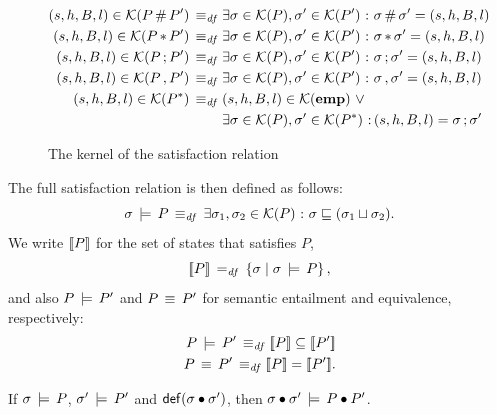 \documentclass[11pt]{article}
\begin{document}
\begin{figure}[ht]
{\begin{minipage}{\columnwidth}
\begin{align*}
		(s,h,B,l) \in \mathcal{K}(P \operatorname{\#} P') \operatorname{\;\equiv_{\mathit{df}}\;} & \exists \sigma \in \mathcal{K}(P), \sigma' \in \mathcal{K}(P') \operatorname{\,:\,} \sigma \operatorname{\#} \sigma' = (s,h,B,l) \\
		(s,h,B,l) \in \mathcal{K}(P \operatorname{\ast} P') \operatorname{\;\equiv_{\mathit{df}}\;} & \exists \sigma \in \mathcal{K}(P), \sigma' \in \mathcal{K}(P') \operatorname{\,:\,} \sigma \operatorname{\ast} \sigma' = (s,h,B,l) \\
		(s,h,B,l) \in \mathcal{K}(P \operatorname{;} P') \operatorname{\;\equiv_{\mathit{df}}\;} & \exists \sigma \in \mathcal{K}(P), \sigma' \in \mathcal{K}(P') \operatorname{\,:\,} \sigma \operatorname{;} \sigma' = (s,h,B,l) \\
		(s,h,B,l) \in \mathcal{K}(P \operatorname{,} P') \operatorname{\;\equiv_{\mathit{df}}\;} & \exists \sigma \in \mathcal{K}(P), \sigma' \in \mathcal{K}(P') \operatorname{\,:\,} \sigma \operatorname{,} \sigma' = (s,h,B,l) \\
		(s,h,B,l) \in \mathcal{K}(P^{\ast}) \operatorname{\;\equiv_{\mathit{df}}\;} & (s,h,B,l) \in \mathcal{K}(\mathbf{emp}) \operatorname{\,\vee\,} \\ &  \exists \sigma \in \mathcal{K}(P),\sigma' \in \mathcal{K}(P^{\ast}) \operatorname{\,:\,} (s,h,B,l) = \sigma \operatorname{;} \sigma'
	\end{align*}
\end{minipage}}
	\caption{\label{fig:presat-relation} The kernel of the satisfaction relation}
\end{figure}

The full satisfaction relation is then defined as follows: \[ \sigma \,\models\, P \operatorname{\;\equiv_{\mathit{df}}\;} \exists \sigma_1,\sigma_2 \in \mathcal{K}(P) \operatorname{\,:\,} \sigma \sqsubseteq (\sigma_1 \sqcup \sigma_2).\] We write $[\![P]\!]$ for the set of states that satisfies $P$,\[ [\![P]\!] \operatorname{\;=_{\mathit{df}}\;} \left\lbrace \sigma \mid \sigma \,\models\, P \right\rbrace,\] and also $P \,\models\, P'$ and $P \,\equiv\, P'$ for semantic entailment and equivalence, respectively: \begin{align*}
	P \sentails P' \iffdef \pred{P} \subseteq \pred{P'} \\
	P \sequiv P' \iffdef \pred{P} = \pred{P'}.
\end{align*} 

\begin{lemma}
	\label{lem:separation-satisfaction}
	If $\sigma \,\models\, P$, $\sigma' \,\models\, P'$ and $\mathsf{def}(\sigma \bullet \sigma')$, then $\sigma \bullet \sigma' \,\models\, P \bullet P'$. 
\end{lemma}

\end{document}
